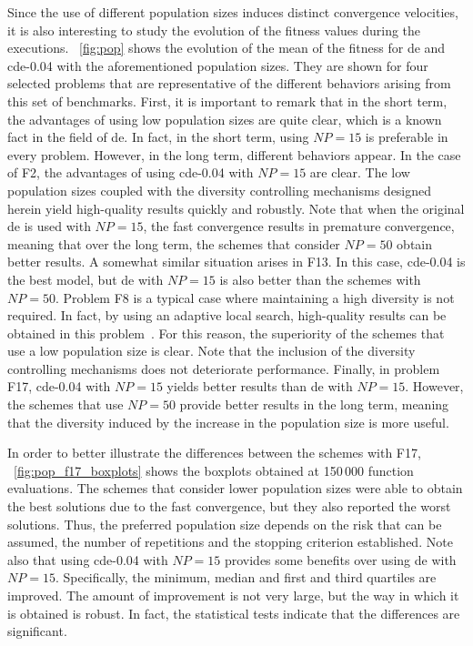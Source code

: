 \documentclass[preprint,3p]{elsarticle}
\newcommand{\CDE}{c{\sc de}}
\newcommand{\DE}{{\sc de}}
\begin{document}
Since the use of different population sizes induces distinct convergence velocities, it is also interesting to study 
the evolution of the fitness values during the executions.
%
\figurename~\ref{fig:pop} shows the evolution of the mean of the fitness for \DE{} and \CDE{}-0.04 with the aforementioned population sizes.
%
They are shown for four selected problems that are representative of the different behaviors arising from this set of benchmarks.
%
First, it is important to remark that in the short term, the advantages of using low population sizes are quite clear, which is a known
fact in the field of \DE{}.
%
In fact, in the short term, using $NP = 15$ is preferable in every problem.
%
However, in the long term, different behaviors appear.
%
In the case of F2, the advantages of using \CDE{}-0.04 with $NP = 15$ are clear.
%
The low population sizes coupled with the diversity controlling mechanisms designed herein yield high-quality results quickly and robustly.
%
Note that when the original \DE{} is used with $NP = 15$, the fast convergence results in premature convergence, meaning that over the long term, the schemes
that consider $NP = 50$ obtain better results.
%
A somewhat similar situation arises in F13.
%
In this case, \CDE{}-0.04 is the best model, but \DE{} with $NP = 15$ is also better than the schemes with $NP = 50$.
%
Problem F8 is a typical case where maintaining a high diversity is not required.
%
In fact, by using an adaptive local search, high-quality results can be obtained in this problem~\cite{LaTorre:11}.
%
For this reason, the superiority of the schemes that use a low population size is clear.
%
Note that the inclusion of the diversity controlling mechanisms does not deteriorate performance.
%
Finally, in problem F17, \CDE{}-0.04 with $NP = 15$ yields better results than \DE{} with $NP = 15$.
%
However, the schemes that use $NP = 50$ provide better results in the long term, meaning that the diversity
induced by the increase in the population size is more useful.


In order to better illustrate the differences between the schemes with F17, \figurename~\ref{fig:pop_f17_boxplots}
shows the boxplots obtained at 150$\,$000 function evaluations.
%
The schemes that consider lower population sizes were able to obtain the best solutions due to the fast convergence,
but they also reported the worst solutions.
%
Thus, the preferred population size depends on the risk that can be assumed, the number of repetitions and the stopping criterion established.
%
Note also that using \CDE{}-0.04 with $NP = 15$ provides some benefits over using \DE{} with $NP=15$.
%
Specifically, the minimum, median and first and third quartiles are improved.
%
The amount of improvement is not very large, but the way in which it is obtained is robust.
%
In fact, the statistical tests indicate that the differences are significant.
%
\end{document}
